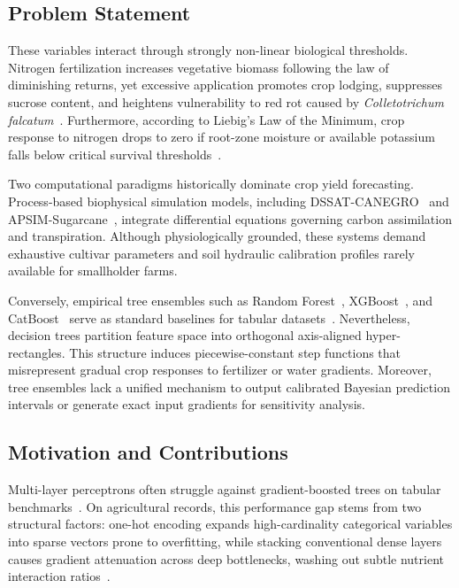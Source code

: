 \documentclass[conference,10pt,letterpaper]{IEEEtran}
\begin{document}
\subsection{Problem Statement}
These variables interact through strongly non-linear biological thresholds. Nitrogen fertilization increases vegetative biomass following the law of diminishing returns, yet excessive application promotes crop lodging, suppresses sucrose content, and heightens vulnerability to red rot caused by \textit{Colletotrichum falcatum}~\cite{socadagui2026spatial}. Furthermore, according to Liebig's Law of the Minimum, crop response to nitrogen drops to zero if root-zone moisture or available potassium falls below critical survival thresholds~\cite{everingham2016accurate,inman2005sugarcane}.

Two computational paradigms historically dominate crop yield forecasting. Process-based biophysical simulation models, including DSSAT-CANEGRO~\cite{singels2005modelling} and APSIM-Sugarcane~\cite{keating1999modelling}, integrate differential equations governing carbon assimilation and transpiration. Although physiologically grounded, these systems demand exhaustive cultivar parameters and soil hydraulic calibration profiles rarely available for smallholder farms. 

Conversely, empirical tree ensembles such as Random Forest~\cite{breiman2001random}, XGBoost~\cite{chen2016xgboost}, and CatBoost~\cite{prokhorenkova2018catboost} serve as standard baselines for tabular datasets~\cite{van2020crop,silva2020sugarcane}. Nevertheless, decision trees partition feature space into orthogonal axis-aligned hyper-rectangles. This structure induces piecewise-constant step functions that misrepresent gradual crop responses to fertilizer or water gradients. Moreover, tree ensembles lack a unified mechanism to output calibrated Bayesian prediction intervals or generate exact input gradients for sensitivity analysis.

\subsection{Motivation and Contributions}
Multi-layer perceptrons often struggle against gradient-boosted trees on tabular benchmarks~\cite{shwartz2022tabular,borisov2022deep}. On agricultural records, this performance gap stems from two structural factors: one-hot encoding expands high-cardinality categorical variables into sparse vectors prone to overfitting, while stacking conventional dense layers causes gradient attenuation across deep bottlenecks, washing out subtle nutrient interaction ratios~\cite{gorishniy2021revisiting}.
\end{document}
